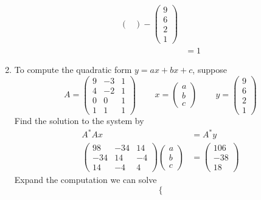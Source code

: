 \begin{homeworkProblem}
\begin{enumerate}[label=(\roman*)]
\[\begin{aligned}
\begin{pmatrix}
        \end{pmatrix} - \begin{pmatrix}
            9 \\ 6 \\ 2 \\ 1
        \end{pmatrix}\\
        &= 1
    \end{aligned}
    \]
    \pagebreak
    \item To compute the quadratic form $y = ax + bx + c$, suppose \[
        A = \begin{pmatrix}
            9 & -3 & 1 \\
            4 & -2 & 1 \\
            0 & 0 & 1 \\
            1 & 1 & 1
        \end{pmatrix}
        \quad \, \quad
        x = \begin{pmatrix}
            a \\ b \\ c
        \end{pmatrix}
        \quad \, \quad
        y = \begin{pmatrix}
            9 \\
            6 \\
            2 \\
            1
        \end{pmatrix}
    \]
    Find the solution to the system by \[
        \begin{aligned}
            A^* Ax &= A^* y\\
            \begin{pmatrix}
                98 & -34 & 14\\
                -34 & 14 & -4\\
                14 & -4 & 4
            \end{pmatrix}\begin{pmatrix}
                a \\ b\\ c
            \end{pmatrix} &= \begin{pmatrix}
                106 \\ -38 \\ 18
            \end{pmatrix}
        \end{aligned}
        \]
        Expand the computation we can solve \[
        \left\{
\]
\end{enumerate}
\end{homeworkProblem}
